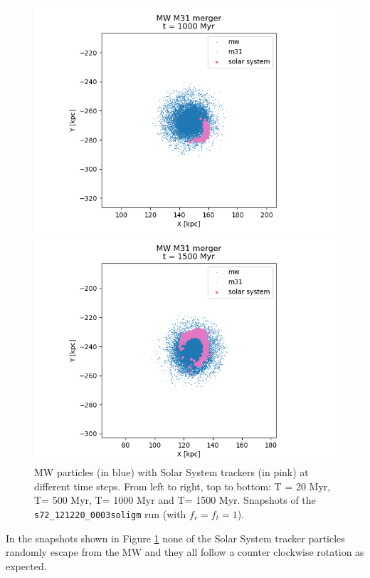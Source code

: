 \documentclass[a4paper,12pt, english]{article}
\begin{document}
\begin{figure}[!h]
\begin{minipage}{0.48\textwidth}
\includegraphics[width=1\textwidth]{simulations-plots/Solarevolution/mw_m31_mwzoomed_merger_0050.png}
\end{minipage}
\begin{minipage}{0.48\textwidth}
  \centering
\includegraphics[width=1\textwidth]{simulations-plots/Solarevolution/mw_m31_mwzoomed_merger_0075.png}
\end{minipage}
\caption{MW particles (in blue) with Solar System trackers (in pink) at different time steps. From left to right, top to bottom: T = 20 Myr, T= 500 Myr, T= 1000 Myr and T= 1500 Myr. Snapshots of the \texttt{s72\_121220\_0003soligm} run (with \(f_r = f_t = 1\)).}
\label{fig:mw-frames}
\end{figure}

In the snapshots shown in Figure \ref{fig:mw-frames} none of the Solar System tracker particles randomly escape from the MW and they all follow a counter clockwise rotation as expected.
\end{document}
